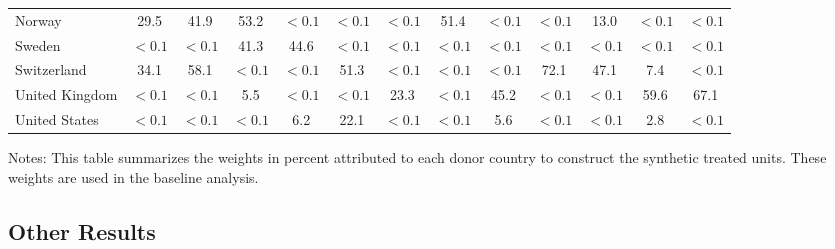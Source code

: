 \documentclass[12pt]{article}
\newcommand{\annote}[1]{\parbox{\textwidth}{\renewcommand{\baselinestretch}{1.0}\vspace{12pt} \small Notes: #1}}
\begin{document}
\begin{appendices}
\begin{landscape}
\begin{table}[htbp]
\begin{tabular}{lcccccccccccc}
Norway &       29.5 &       41.9 &      53.2 &       $<0.1$ &       $<0.1$ &       $<0.1$ &     51.4 &       $<0.1$ &       $<0.1$ &      13.0 &       $<0.1$ &       $<0.1$ \\  
Sweden &        $<0.1$ &       $<0.1$ &      41.3 &     44.6 &     $<0.1$ &       $<0.1$ &       $<0.1$ &      $<0.1$ &       $<0.1$ &       $<0.1$ &       $<0.1$ &       $<0.1$ \\  
Switzerland &       34.1 &      58.1 &     $<0.1$ &       $<0.1$ &     51.3 &       $<0.1$ &       $<0.1$ &      $<0.1$ &      72.1 &      47.1 &      7.4 &      $<0.1$ \\  
United Kingdom &      $<0.1$ &       $<0.1$ &       5.5 &       $<0.1$ &       $<0.1$ &      23.3 &       $<0.1$ &       45.2 &       $<0.1$ &       $<0.1$ &      59.6 &       67.1 \\  
United States &        $<0.1$ &       $<0.1$ &     $<0.1$ &     6.2 &      22.1 &      $<0.1$ &       $<0.1$ &     5.6 &       $<0.1$ &       $<0.1$ &       2.8 &     $<0.1$ \\
\bottomrule
\end{tabular}
\annote{This table summarizes the weights in percent attributed to each donor country to construct the synthetic treated units. These weights are used in the baseline analysis.}
\end{table}
\end{landscape}
\clearpage

\subsection{Other Results}


\end{appendices}
\end{document}
